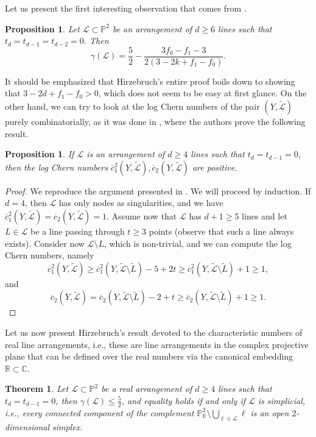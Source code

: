 \documentclass{article}
\theoremstyle{plain}
\newtheorem{theorem}[thm]{Theorem}
\newtheorem{proposition}[thm]{Proposition}
\theoremstyle{definition}
\numberwithin{equation}{section}
\begin{document}
Let us present the first interesting observation that comes from \cite[p. 135]{Hirzebruch}.
\begin{proposition}
Let $\mathcal{L} \subset \mathbb{P}^{2}$ be an arrangement of $d\geq 6$ lines such that $t_{d}=t_{d-1}=t_{d-2}=0$. Then  
\[\gamma(\mathcal{L})  = \frac{5}{2} - \frac{3f_{0}-f_{1}-3}{2(3-2k+f_{1}-f_{0})}. \]
\end{proposition}
\noindent It should be emphasized that Hirzebruch's entire proof boils down to showing that $3-2d+f_{1} - f_{0} > 0$, which does not seem to be easy at first glance. On the other hand, we can try to look at the log Chern numbers of the pair $(Y,\widetilde{\mathcal{L}})$ purely combinatorially, as it was done in \cite{EFU}, where the authors prove the following result.
\begin{proposition}
If $\mathcal{L}$ is an arrangement of $d\geq 4$ lines such that $t_{d}=t_{d-1}=0$, then
the log Chern numbers $\overline{c}_{1}^{2}(Y,\widetilde{\mathcal{L}}), \overline{c}_{2}(Y,\widetilde{\mathcal{L}})$ are positive.
\end{proposition}
\begin{proof}
We reproduce the argument presented in \cite[Proposition 3.3]{EFU}. We will proceed by induction.
If $d=4$, then $\mathcal{L}$ has only nodes as singularities, and we have $\overline{c}_{1}^{2}(Y,\widetilde{\mathcal{L}})=\overline{c}_{2}(Y,\widetilde{\mathcal{L}})=1$. Assume now that $\mathcal{L}$ has $d+1 \geq 5$ lines and let $L \in \mathcal{L}$ be a line passing through $t\geq 3$ points (observe that such a line always exists). Consider now $\mathcal{L}\setminus L$, which is non-trivial, and we can compute the log Chern numbers, namely
\[\overline{c}_{1}^{2}(Y,\widetilde{\mathcal{L}}) \geq \overline{c}_{1}^{2}(Y,\widetilde{\mathcal{L}} \setminus \widetilde{L})  -5 + 2t \geq \overline{c}_{1}^{2}(Y, \widetilde{\mathcal{L}}\setminus \widetilde{L} ) + 1 \geq 1,\]
and
\[\overline{c}_{2}(Y,\widetilde{\mathcal{L}}) = \overline{c}_{2}(Y, \widetilde{\mathcal{L}} \setminus \widetilde{L}) - 2 + t \geq \overline{c}_{2}(Y, \widetilde{\mathcal{L}}\setminus \widetilde{L}) + 1 \geq 1.\]
\end{proof}
Let us now present Hirzebruch's result devoted to the characteristic numbers of real line arrangements, i.e., these are line arrangements in the complex projective plane that can be defined over the real numbers via the canonical embedding $\mathbb{R} \subset \mathbb{C}$.
\begin{theorem}
\label{charR}
 Let $\mathcal{L}\subset \mathbb{P}^{2}$ be a real arrangement of $d\geq 4$ lines such that $t_{d}=t_{d-1}=0$, then
$\gamma(\mathcal{L}) \leq \frac{5}{2}$, and equality holds if and only if $\mathcal{L}$ is simplicial, i.e., every connected component of the complement $\mathbb{P}^{2}_{\mathbb{R}}\setminus \bigcup_{\ell \in \mathcal{L}}\ell$ is an open $2$-dimensional simplex.    
\end{theorem}
\end{document}
